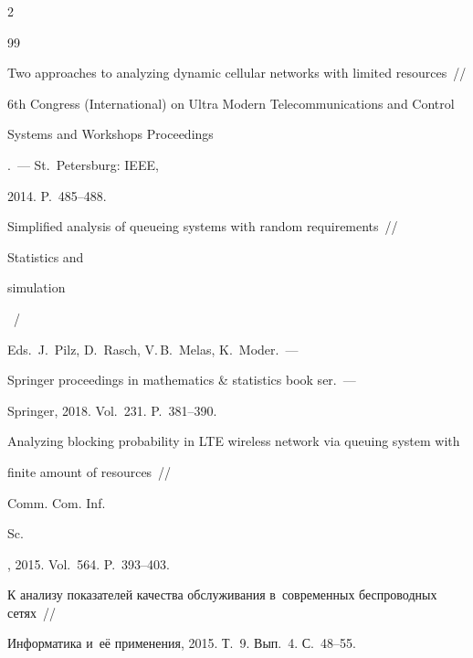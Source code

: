 \begin{multicols}{2}
{{\begin{thebibliography}{99}






Two approaches to analyzing dynamic cellular networks with limited resources~// 


{6th  Congress (International) on Ultra Modern Telecommunications and Control 


Systems and Workshops Proceedings}.~--- St.\ Petersburg: IEEE, 


2014. P.~485--488.











Simplified analysis of queueing systems with random requirements~// {Statistics and


simulation}~/


Eds.\ J.~Pilz, D.~Rasch, V.\,B.~Melas, K.~Moder.~---


Springer proceedings in mathematics \& statistics book ser.~---


Springer, 2018. Vol.~231. P.~381--390.











Analyzing blocking probability in LTE wireless network via queuing system with 


finite amount of resources~// {Comm. Com. Inf. 


Sc.}, 2015. Vol.~564. P.~393--403.











К анализу показателей качества обслуживания в~современных беспроводных сетях~// 


{Информатика и~её применения}, 2015. Т.~9. Вып.~4. С.~48--55.










\end{thebibliography}}}
\end{multicols}
